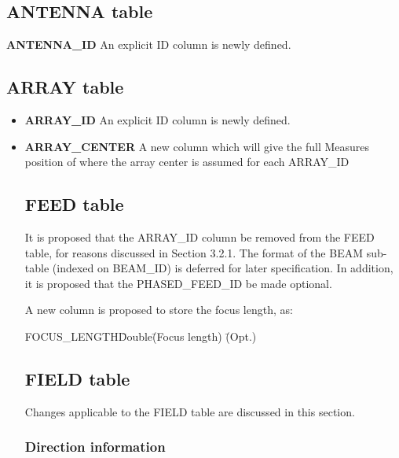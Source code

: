 \documentclass{article}
\begin{document}
\subsection{ANTENNA table}

\item {{\bf ANTENNA\_ID} An explicit ID column is newly defined}.





\subsection{ARRAY table}


\begin{itemize}

\item {{\bf ARRAY\_ID} An explicit ID column is newly defined}.


\item{{\bf ARRAY\_CENTER} A new column which will give the full Measures position of where the array center is assumed for each ARRAY\_ID}



\subsection{FEED table}

It is proposed that the ARRAY\_ID column be removed from the FEED
table, for reasons discussed in Section 3.2.1.  The format of the BEAM
sub-table (indexed on BEAM\_ID) is deferred for later specification.
In addition, it is proposed that the PHASED\_FEED\_ID be made optional.

A new column is proposed to store the focus length, as:

\begin{tabbing}
FOCUS\_LENGTH\quad\quad \= Double\quad\quad \= 
(Focus length) \quad\quad \= (Opt.) \\ 
\end{tabbing}


\subsection{FIELD table}

Changes applicable to the FIELD table are discussed in this section.

\subsubsection{Direction information}


\end{itemize}
\end{document}

